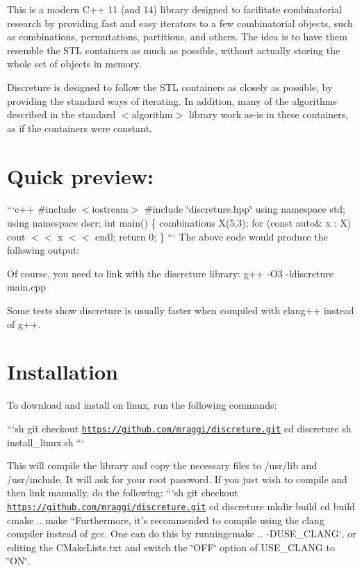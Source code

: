 This is a modern C++ 11 (and 14) library designed to facilitate combinatorial research by providing fast and easy iterators to a few combinatorial objects, such as combinations, permutations, partitions, and others. The idea is to have them resemble the S\-T\-L containers as much as possible, without actually storing the whole set of objects in memory.

Discreture is designed to follow the S\-T\-L containers as closely as possible, by providing the standard ways of iterating. In addition, many of the algorithms described in the standard $<$algorithm$>$ library work as-\/is in these containers, as if the containers were constant.

\section*{Quick preview\-:}

```c++ \#include $<$iostream$>$ \#include \char`\"{}discreture.\-hpp\char`\"{} using namespace std; using namespace dscr; int main() \{ combinations X(5,3); for (const auto\& x \-: X) cout $<$$<$ x $<$$<$ endl; return 0; \} ``` The above code would produce the following output\-: \begin{DoxyVerb}[ 0 1 2 ]
[ 0 1 3 ]
[ 0 2 3 ]
[ 1 2 3 ]
[ 0 1 4 ]
[ 0 2 4 ]
[ 1 2 4 ]
[ 0 3 4 ]
[ 1 3 4 ]
[ 2 3 4 ]
\end{DoxyVerb}


Of course, you need to link with the discreture library\-: g++ -\/\-O3 -\/ldiscreture main.\-cpp

Some tests show discreture is usually faster when compiled with clang++ instead of g++.

\section*{Installation}

To download and install on linux, run the following commands\-:

```sh git checkout \href{https://github.com/mraggi/discreture.git}{\tt https\-://github.\-com/mraggi/discreture.\-git} cd discreture sh install\-\_\-linux.\-sh ```

This will compile the library and copy the necessary files to /usr/lib and /usr/include. It will ask for your root password. If you just wish to compile and then link manually, do the following\-: ```sh git checkout \href{https://github.com/mraggi/discreture.git}{\tt https\-://github.\-com/mraggi/discreture.\-git} cd discreture mkdir build cd build cmake .. make ``{\ttfamily  Furthermore, it's recommended to compile using the clang compiler instead of gcc. One can do this by running}cmake .. -\/\-D\-U\-S\-E\-\_\-\-C\-L\-A\-N\-G`, or editing the C\-Make\-Lists.\-txt and switch the \char`\"{}\-O\-F\-F\char`\"{} option of U\-S\-E\-\_\-\-C\-L\-A\-N\-G to \char`\"{}\-O\-N\char`\"{}.

